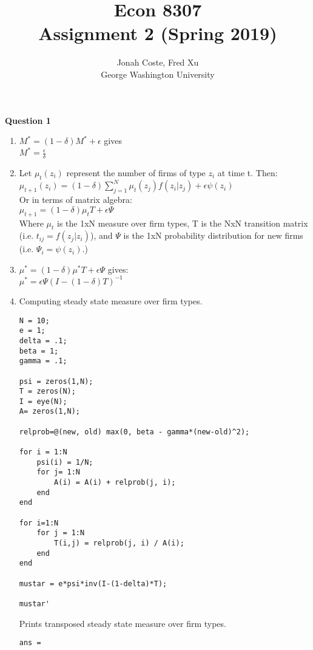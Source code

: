 \documentclass[12pt]{article}
\begin{document}
\begin{onehalfspace}


\title{Econ 8307\\ Assignment 2 (Spring 2019)}
\author{Jonah Coste, Fred Xu\\George Washington University}
\date{}
\maketitle
\parskip 10pt
\textbf{Question 1}
\begin{enumerate}[1.]
	\item
	$M^* = (1-\delta)M^* + \epsilon$ gives\\ $M^*= \frac{\epsilon}{\delta}$
	\item
	Let $\mu_t(z_i)$ represent the number of firms of type $z_i$ at time t. Then:\\
	$\mu_{t+1}(z_i) = (1-\delta)\sum_{j=1}^N{\mu_t(z_j)f(z_i|z_j)} + \epsilon\psi(z_i)$\\
	Or in terms of matrix algebra:\\
	$\mu_{t+1} = (1-\delta)\mu_tT + \epsilon\Psi$\\
	Where $\mu_t$ is the 1xN measure over firm types, T is the NxN transition matrix (i.e. $t_{ij} = f(z_j|z_i)$), and $\Psi$ is the 1xN probability distribution for new firms (i.e. $\Psi_i = \psi(z_i)$.)
	\item
	$\mu^* = (1-\delta)\mu^*T + \epsilon\Psi$ gives:\\
	$\mu^* = \epsilon\Psi(I-(1-\delta)T)^{-1}$
	
	\item
	Computing steady state measure over firm types.
	\begin{lstlisting}
N = 10;
e = 1;
delta = .1;
beta = 1;
gamma = .1;

psi = zeros(1,N);
T = zeros(N);
I = eye(N);
A= zeros(1,N);

relprob=@(new, old) max(0, beta - gamma*(new-old)^2);

for i = 1:N
    psi(i) = 1/N;
    for j= 1:N
        A(i) = A(i) + relprob(j, i);
    end
end

for i=1:N
    for j = 1:N
        T(i,j) = relprob(j, i) / A(i);
    end
end

mustar = e*psi*inv(I-(1-delta)*T);

mustar'
	\end{lstlisting}
	Prints transposed steady state measure over firm types.
	\begin{lstlisting}
ans =


\end{lstlisting}
\end{enumerate}
\end{onehalfspace}
\end{document}
